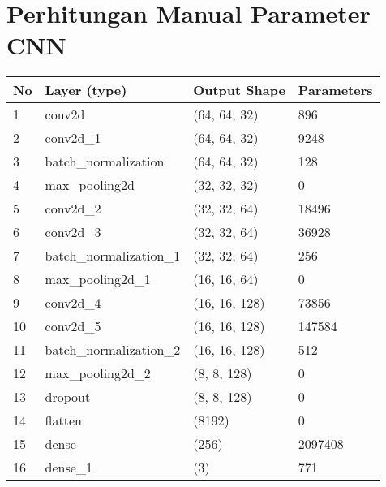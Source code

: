 \chapter{Perhitungan Manual Parameter CNN}



\begin{table}[H]
    \centering
    \scriptsize
    \renewcommand{\arraystretch}{1.5}
    \begin{tabular}{p{1cm}p{4.5cm}p{4cm}p{2.5cm}}
    \hline
    \textbf{No} & \textbf{Layer (type)}   & \textbf{Output Shape} & \textbf{Parameters}  \\ \hline
    
    1 & conv2d                   & (64, 64, 32)   & 896     \\ 
    2 & conv2d\_1                & (64, 64, 32)   & 9248    \\ 
    3 & batch\_normalization     & (64, 64, 32)   & 128     \\ 
    4 & max\_pooling2d           & (32, 32, 32)   & 0       \\ 
    5 & conv2d\_2                & (32, 32, 64)   & 18496   \\ 
    6 & conv2d\_3                & (32, 32, 64)   & 36928   \\ 
    7 & batch\_normalization\_1  & (32, 32, 64)   & 256     \\ 
    8 & max\_pooling2d\_1        & (16, 16, 64)   & 0       \\ 
    9 & conv2d\_4                & (16, 16, 128)  & 73856   \\ 
    10 & conv2d\_5                & (16, 16, 128)  & 147584  \\ 
    11 & batch\_normalization\_2  & (16, 16, 128)  & 512     \\ 
    12 & max\_pooling2d\_2        & (8, 8, 128)    & 0       \\ 
    13 & dropout                  & (8, 8, 128)    & 0       \\ 
    14 & flatten                  & (8192)         & 0       \\ 
    15 & dense                    & (256)          & 2097408 \\ 
    16 & dense\_1                 & (3)            & 771     \\ \hline
    \end{tabular}
\end{table}



